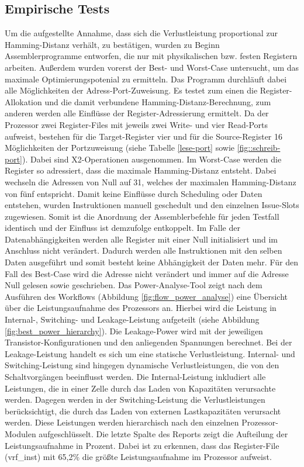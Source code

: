 \subsection{Empirische Tests}
\label{cap:empirischeTests}
Um die aufgestellte Annahme, dass sich die Verlustleistung proportional zur Hamming-Distanz verhält, zu bestätigen, wurden zu Beginn Assemblerprogramme entworfen, die nur mit physikalischen bzw. festen Registern arbeiten.
Außerdem wurden vorerst der Best- und Worst-Case untersucht, um das maximale Optimierungspotenial zu ermitteln. Das Programm durchläuft dabei alle Möglichkeiten der Adress-Port-Zuweisung. Es testet zum einen die Register-Allokation und die damit verbundene Hamming-Distanz-Berechnung, zum anderen werden alle Einflüsse der Register-Adressierung ermittelt. Da der Prozessor zwei Register-Files mit jeweils zwei Write- und vier Read-Ports aufweist, bestehen für die Target-Register vier und für die Source-Register 16 Möglichkeiten der Portzuweisung (siehe Tabelle \ref{lese-port} sowie \ref{fig::schreib-port}). Dabei sind X2-Operationen ausgenommen. Im Worst-Case werden die Register so adressiert, dass die maximale Hamming-Distanz entsteht. Dabei wechseln die Adressen von Null auf 31, welches der maximalen Hamming-Distanz von fünf entspricht. Damit keine Einflüsse durch Scheduling oder Daten entstehen, wurden Instruktionen manuell geschedult und den einzelnen Issue-Slots zugewiesen. Somit ist die Anordnung der Assemblerbefehle für jeden Testfall identisch und der Einfluss ist demzufolge entkoppelt. Im Falle der Datenabhängigkeiten werden alle Register mit einer Null initialisiert und im Anschluss nicht verändert. Dadurch werden alle Instruktionen mit den selben Daten ausgeführt und somit besteht keine Abhängigkeit der Daten mehr.
Für den Fall des Best-Case wird die Adresse nicht verändert und immer auf die Adresse Null gelesen sowie geschrieben.
Das Power-Analyse-Tool zeigt nach dem Ausführen des Workflows (Abbildung \ref{fig:flow_power_analyse}) eine Übersicht über die Leistungsaufnahme des Prozessors an. Hierbei wird die Leistung in Internal-, Switching- und Leakage-Leistung aufgeteilt (siehe Abbildung \ref{fig:best_power_hierarchy}). Die Leakage-Power wird mit der jeweiligen Transistor-Konfigurationen und den anliegenden Spannungen berechnet. Bei der Leakage-Leistung handelt es sich um eine statische Verlustleistung. Internal- und Switching-Leistung sind hingegen dynamische Verlustleistungen, die von den Schaltvorgängen beeinflusst werden. Die Internal-Leistung inkludiert alle Leistungen, die in einer Zelle durch das Laden von Kapazitäten verursachte werden. Dagegen werden in der Switching-Leistung die Verlustleistungen berücksichtigt, die durch das Laden von externen Lastkapazitäten verursacht werden.
Diese Leistungen werden hierarchisch nach den einzelnen Prozessor-Modulen aufgeschlüsselt. Die letzte Spalte des Reports zeigt die Aufteilung der Leistungsaufnahme in Prozent. Dabei ist zu erkennen, dass das Register-File (vrf\_inst) mit 65,2\% die größte Leistungsaufnahme im Prozessor aufweist.

